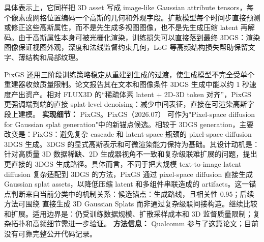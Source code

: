 具体表示上，它同样把 3D asset 写成 image-like Gaussian attribute tensors，每个像素或网格位置编码一个高斯的几何和外观字段。扩散模型每个时间步直接预测或修正这些高斯属性，而不是先生成多视图图像，也不是先生成压缩 latent 再解码。由于高斯属性本身可被光栅化渲染，训练损失可以直接落到最终 3DGS：渲染图像保证视图外观，深度和法线监督约束几何，LoG 等高频结构损失帮助保留文字、薄结构和局部纹理。

PixGS 还用三阶段训练策略稳定从重建到生成的过渡，使生成模型不完全受单个重建器收敛质量限制。论文报告其在文本和图像条件 3DGS 生成中能以约 1 秒速度产出资产。相对 FLUX3D 的“稀疏体素 latent + 2D-3D token 对齐”，PixGS 更强调端到端的直接 splat-level denoising：减少中间表征，直接在可渲染高斯字段上建模。
\textbf{实现细节：} PixGS。PixGS（2026.07） 可作为"Pixel-space diffusion for Gaussian splat generation"中的新锚点候选。相较于 3DGS generation，主要改变是：PixGS：避免复杂 cascade 和 latent-space 瓶颈的 pixel-space diffusion 3DGS 生成。3DGS 的显式高斯表示和可微渲染能力保持为基础。其设计动机是：针对高质量 3D 数据稀缺、2D 生成器视角不一致和复杂级联难扩展的问题，提出更直接的 3DGS 生成路径。具体而言，不同于把大规模 text-to-image latent diffusion 复杂适配到 3DGS 的方法，PixGS 通过 pixel-space diffusion 直接生成 Gaussian splat assets，以降低压缩 latent 和多组件串联造成的 artifacts。这一锚点判断来自当前分类中的机制关系：候选锚点：生成路线，且相关性 0.95；后续方法可围绕 直接生成 3D Gaussian Splats 而非通过复杂级联间接构造。继续比较和扩展。适用边界是：仍受训练数据规模、扩散采样成本和 3D 监督质量限制；复杂拓扑和高频细节需进一步验证。
\textbf{方法信息：} Qualcomm 参与了这篇论文；目前没有可靠完整公开代码记录。

